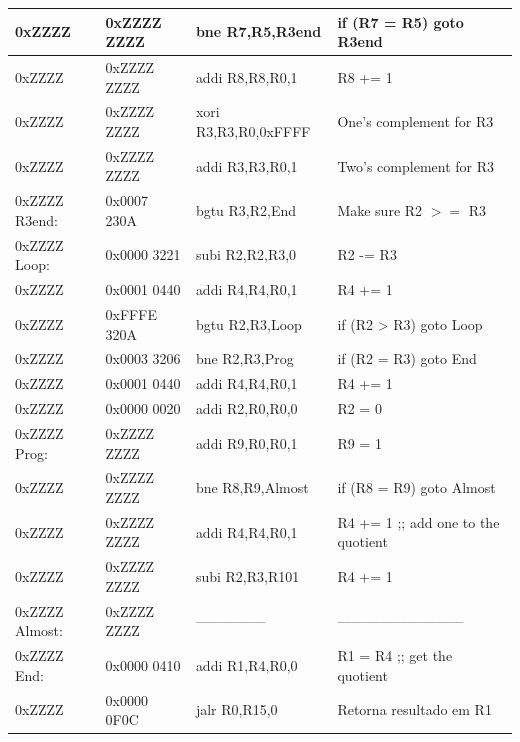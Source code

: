 \documentclass[12pt]{article}
\begin{document}
\begin{table}[H]
\begin{tabular}{|l|l|l|l|}
        0xZZZZ         & 0xZZZZ ZZZZ & bne  R7,R5,R3end     & if (R7 \!= R5) goto R3end                     \\\hline
        0xZZZZ         & 0xZZZZ ZZZZ & addi R8,R8,R0,1      & R8 += 1                                       \\\hline
        0xZZZZ         & 0xZZZZ ZZZZ & xori R3,R3,R0,0xFFFF & One's complement for R3                       \\\hline
        0xZZZZ         & 0xZZZZ ZZZZ & addi R3,R3,R0,1      & Two's complement for R3                       \\\hline
        0xZZZZ R3end:  & 0x0007 230A & bgtu R3,R2,End       & Make sure R2 $>=$ R3                          \\\hline
        0xZZZZ Loop:   & 0x0000 3221 & subi R2,R2,R3,0      & R2 -= R3                                      \\\hline
        0xZZZZ         & 0x0001 0440 & addi R4,R4,R0,1      & R4 += 1                                       \\\hline
        0xZZZZ         & 0xFFFE 320A & bgtu R2,R3,Loop      & if (R2 > R3) goto Loop                        \\\hline
        0xZZZZ         & 0x0003 3206 & bne  R2,R3,Prog      & if (R2 \!= R3) goto End                       \\\hline
        0xZZZZ         & 0x0001 0440 & addi R4,R4,R0,1      & R4 += 1                                       \\\hline
        0xZZZZ         & 0x0000 0020 & addi R2,R0,R0,0      & R2 = 0                                        \\\hline
        0xZZZZ Prog:   & 0xZZZZ ZZZZ & addi R9,R0,R0,1      & R9 = 1                                        \\\hline
        0xZZZZ         & 0xZZZZ ZZZZ & bne  R8,R9,Almost    & if (R8 \!= R9) goto Almost                    \\\hline
        0xZZZZ         & 0xZZZZ ZZZZ & addi R4,R4,R0,1      & R4 += 1 ;; add one to the quotient            \\\hline
        0xZZZZ         & 0xZZZZ ZZZZ & subi R2,R3,R101      & R4 += 1                                       \\\hline
        0xZZZZ Almost: & 0xZZZZ ZZZZ & ---------------      & ---------------------------                   \\\hline
        0xZZZZ End:    & 0x0000 0410 & addi R1,R4,R0,0      & R1 = R4 ;; get the quotient                   \\\hline
        0xZZZZ         & 0x0000 0F0C & jalr R0,R15,0        & Retorna resultado em R1                       \\\hline
    \end{tabular}\label{tab:programs:div}
\end{table}
\end{document}
